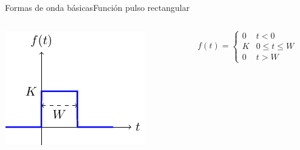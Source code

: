 \documentclass[aspectratio=169, xcolor={usenames,svgnames,dvipsnames}]{beamer}
\begin{document}
\begin{frame}{Formas de onda básicas}{Función pulso rectangular}
\begin{columns}
\begin{column}{0.5\columnwidth}
\begin{center}
\includegraphics[width=.9\linewidth]{../figs/pulso.pdf}
\end{center}
\end{column}

\begin{column}{0.5\columnwidth}
\[
  f(t) = %
  \begin{cases}
    0 & t < 0\\
    K & 0 \leq t \leq W\\
    0 & t>W
  \end{cases}
  \]
\end{column}
\end{columns}
\end{frame}
\end{document}

